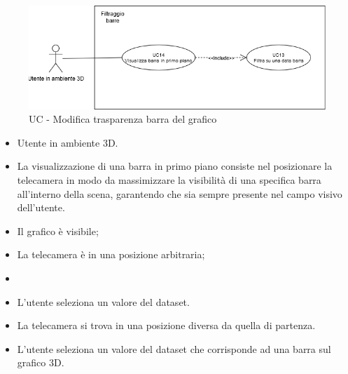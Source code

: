\begin{figure}[h!]\centering
    \includegraphics[scale=0.7]{template/images/UC14.png}
    \caption{UC - Modifica trasparenza barra del grafico}
\end{figure}
\UCdsc
{ %
    \begin{itemize}
        \item Utente in ambiente 3D.
    \end{itemize}
}
{ %
    \begin{itemize}
        \item La visualizzazione di una barra in primo piano consiste nel posizionare la telecamera in modo da massimizzare la visibilità di una specifica barra all'interno della scena, garantendo che sia sempre presente nel campo visivo dell'utente.
    \end{itemize}
}
{ %
    \begin{itemize}
        \item Il grafico è visibile;
        \item La telecamera è in una posizione arbitraria;
        \item \item L'utente seleziona un valore del dataset.
    \end{itemize}
}
{ %
    \begin{itemize}
        \item La telecamera si trova in una posizione diversa da quella di partenza.
    \end{itemize}
}
{ %
    \begin{itemize}
        \item L'utente seleziona un valore del dataset che corrisponde ad una barra sul grafico 3D.
    \end{itemize}
}


